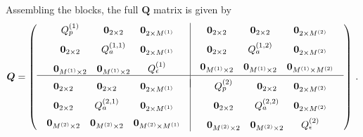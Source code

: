 \documentclass[]{scrartcl}
\begin{document}
	Assembling the blocks, the full \( \boldsymbol{Q} \) matrix is given by
	\begin{equation}
		\boldsymbol{Q} =
		\begin{pmatrix}
			\begin{array}{c|c}
				\begin{array}{ccc}
					Q_p^{(1)} & \boldsymbol{0}_{2\times2} & \boldsymbol{0}_{2\times M^{(1)}}
					\\[2mm]
					\boldsymbol{0}_{2\times2} & Q_a^{(1,1)} & \boldsymbol{0}_{2\times M^{(1)}}
					\\[2mm]
					\boldsymbol{0}_{M^{(1)}\times2} & \boldsymbol{0}_{M^{(1)}\times2} & Q_\epsilon^{(1)}
				\end{array}
				& 
				\begin{array}{ccc}
					\boldsymbol{0}_{2\times2} & \boldsymbol{0}_{2\times2} & \boldsymbol{0}_{2\times M^{(2)}
					}\\[2mm]
					\boldsymbol{0}_{2\times2} & Q_a^{(1,2)} & \boldsymbol{0}_{2\times M^{(2)}
					}\\[2mm]
					\boldsymbol{0}_{M^{(1)}\times2} & \boldsymbol{0}_{M^{(1)}\times2} & \boldsymbol{0}_{M^{(1)}\times M^{(2)}
					}
				\end{array}
				\\[4mm]
				\hline \\[-3mm]
				\begin{array}{ccc}
					\boldsymbol{0}_{2\times2} & \boldsymbol{0}_{2\times2} & \boldsymbol{0}_{2\times M^{(1)}
					}\\[2mm]
					\boldsymbol{0}_{2\times2} & Q_a^{(2,1)} & \boldsymbol{0}_{2\times M^{(1)}
					}\\[2mm]
					\boldsymbol{0}_{M^{(2)}\times2} & \boldsymbol{0}_{M^{(2)}\times2} & \boldsymbol{0}_{M^{(2)}\times M^{(1)}
					}
				\end{array}
				&
				\begin{array}{ccc}
					Q_p^{(2)} & \boldsymbol{0}_{2\times2} & \boldsymbol{0}_{2\times M^{(2)}
					}\\[2mm]
					\boldsymbol{0}_{2\times2} & Q_a^{(2,2)} & \boldsymbol{0}_{2\times M^{(2)}
					}\\[2mm]
					\boldsymbol{0}_{M^{(2)}\times2} & \boldsymbol{0}_{M^{(2)}\times2} & Q_\epsilon^{(2)}
				\end{array}
			\end{array}
		\end{pmatrix}\,.
	\end{equation}
	
\end{document}
